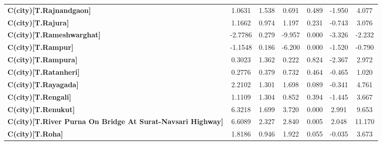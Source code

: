 \begin{center}
\begin{tabular}{lcccccc}
\textbf{C(city)[T.Rajnandgaon]}                                                                     &       1.0631  &        1.538     &     0.691  &         0.489        &       -1.950    &        4.077     \\
\textbf{C(city)[T.Rajura]}                                                                          &       1.1662  &        0.974     &     1.197  &         0.231        &       -0.743    &        3.076     \\
\textbf{C(city)[T.Rameshwarghat]}                                                                   &      -2.7786  &        0.279     &    -9.957  &         0.000        &       -3.326    &       -2.232     \\
\textbf{C(city)[T.Rampur]}                                                                          &      -1.1548  &        0.186     &    -6.200  &         0.000        &       -1.520    &       -0.790     \\
\textbf{C(city)[T.Rampura]}                                                                         &       0.3023  &        1.362     &     0.222  &         0.824        &       -2.367    &        2.972     \\
\textbf{C(city)[T.Ratanheri]}                                                                       &       0.2776  &        0.379     &     0.732  &         0.464        &       -0.465    &        1.020     \\
\textbf{C(city)[T.Rayagada]}                                                                        &       2.2102  &        1.301     &     1.698  &         0.089        &       -0.341    &        4.761     \\
\textbf{C(city)[T.Rengali]}                                                                         &       1.1109  &        1.304     &     0.852  &         0.394        &       -1.445    &        3.667     \\
\textbf{C(city)[T.Renukut]}                                                                         &       6.3218  &        1.699     &     3.720  &         0.000        &        2.991    &        9.653     \\
\textbf{C(city)[T.River Purna On Bridge At Surat-Navsari Highway]}                                  &       6.6089  &        2.327     &     2.840  &         0.005        &        2.048    &       11.170     \\
\textbf{C(city)[T.Roha]}                                                                            &       1.8186  &        0.946     &     1.922  &         0.055        &       -0.035    &        3.673     \\

\end{tabular}
\end{center}
